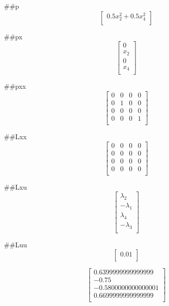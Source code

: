 ##p
\begin{equation}
\left[
\begin{array}{c}
0.5 x_2^{2} + 0.5 x_4^{2} \\
\end{array}
\right]
\end{equation}


##px
\begin{equation}
\left[
\begin{array}{c}
0 \\
x_2 \\
0 \\
x_4 \\
\end{array}
\right]
\end{equation}


##pxx
\begin{equation}
\left[
\begin{array}{cccc}
0 & 0 & 0 & 0 \\
0 & 1 & 0 & 0 \\
0 & 0 & 0 & 0 \\
0 & 0 & 0 & 1 \\
\end{array}
\right]
\end{equation}


##Lxx
\begin{equation}
\left[
\begin{array}{cccc}
0 & 0 & 0 & 0 \\
0 & 0 & 0 & 0 \\
0 & 0 & 0 & 0 \\
0 & 0 & 0 & 0 \\
\end{array}
\right]
\end{equation}


##Lxu
\begin{equation}
\left[
\begin{array}{c}
\lambda_2 \\
 - \lambda_1 \\
\lambda_4 \\
 - \lambda_3 \\
\end{array}
\right]
\end{equation}


##Luu
\begin{equation}
\left[
\begin{array}{c}
0.01 \\
\end{array}
\right]
\end{equation}


\begin{equation}
\left[
\begin{array}{c}
0.6399999999999999 \\
-0.75 \\
-0.5800000000000001 \\
0.6699999999999999 \\
\end{array}
\right]
\end{equation}
